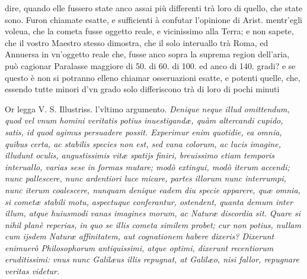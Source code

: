 \documentclass[11pt,twoside,openany]{book}
\begin{document}
dire, quando elle fussero state anco assai più differenti trà loro di quello, che state sono. Furon chiamate esatte, e sufficienti à confutar l'opinione di Arist. mentr'egli voleua, che la cometa fusse oggetto reale, e vicinissimo alla Terra; e non sapete, che il vostro Maestro stesso dimostra, che il solo interuallo trà Roma, ed Annuersa in vn'oggetto reale che, fusse anco sopra la suprema region dell'aria, può cagionar Paralasse maggiore di 50. di 60. di 100. ed anco di 140. gradi? e se questo è non si potranno elleno chiamar osseruazioni esatte, e potenti quelle, che, essendo tutte minori d'vn grado solo differiscono trà di loro di pochi minuti



\par\bigskip\noindent{}\enspace Or legga V. S. Illustriss. l'vltimo argumento. \textit{Denique neque illud omittendum, quod vel vnum homini veritatis potius inuestigandæ, quàm altercandi cupido, satis, id quod agimus persuadere possit. Experimur enim quotidie, ea omnia, quibus certa, ac stabilis species non est, sed vana colorum, ac lucis imagine, illudunt oculis, angustissimis vitæ spatijs finiri, breuissimo etiam temporis interuallo, varias sese in formas mutare; modò extingui, modò iterum accendi; nunc pallescere, nunc ardentiori luce micare, partes illorum nunc interrumpi, nunc iterum coalescere, nunquam denique eadem diu specie apparere, quæ omnia, si cometæ stabili motu, aspectuque conferantur, ostendent, quanta demum inter illum, atque huiusmodi vanas imagines morum, ac Naturæ discordia sit. Quare si nihil planè reperias, in quo se illis cometa similem probet; cur non potius, nullam cum ijsdem Naturæ affinitatem, aut cognationem habere dixeris? Dixerunt enimuerò Philosophorum antiquissimi, atque optimi, dixerunt recentiorum eruditissimi: vnus nunc Galilæus illis repugnat, at Galilæo, nisi fallor, repugnare veritas videtur.}
\end{document}
